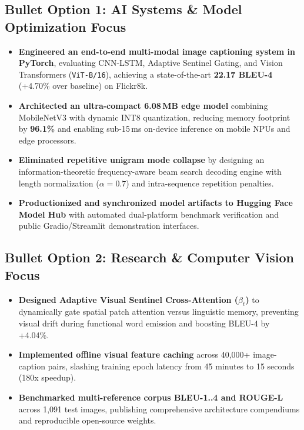 \documentclass[11pt,a4paper]{article}
\begin{document}
\subsection*{Bullet Option 1: AI Systems \& Model Optimization Focus}
\begin{itemize}[leftmargin=*]
    \item \textbf{Engineered an end-to-end multi-modal image captioning system in PyTorch}, evaluating CNN-LSTM, Adaptive Sentinel Gating, and Vision Transformers (\texttt{ViT-B/16}), achieving a state-of-the-art \textbf{22.17 BLEU-4} (+4.70\% over baseline) on Flickr8k.
    \item \textbf{Architected an ultra-compact 6.08\,MB edge model} combining MobileNetV3 with dynamic INT8 quantization, reducing memory footprint by \textbf{96.1\%} and enabling sub-15\,ms on-device inference on mobile NPUs and edge processors.
    \item \textbf{Eliminated repetitive unigram mode collapse} by designing an information-theoretic frequency-aware beam search decoding engine with length normalization ($\alpha=0.7$) and intra-sequence repetition penalties.
    \item \textbf{Productionized and synchronized model artifacts to Hugging Face Model Hub} with automated dual-platform benchmark verification and public Gradio/Streamlit demonstration interfaces.
\end{itemize}

\subsection*{Bullet Option 2: Research \& Computer Vision Focus}
\begin{itemize}[leftmargin=*]
    \item \textbf{Designed Adaptive Visual Sentinel Cross-Attention ($\beta_t$)} to dynamically gate spatial patch attention versus linguistic memory, preventing visual drift during functional word emission and boosting BLEU-4 by +4.04\%.
    \item \textbf{Implemented offline visual feature caching} across 40,000+ image-caption pairs, slashing training epoch latency from 45 minutes to 15 seconds (180x speedup).
    \item \textbf{Benchmarked multi-reference corpus BLEU-1..4 and ROUGE-L} across 1,091 test images, publishing comprehensive architecture compendiums and reproducible open-source weights.
\end{itemize}
\end{document}
